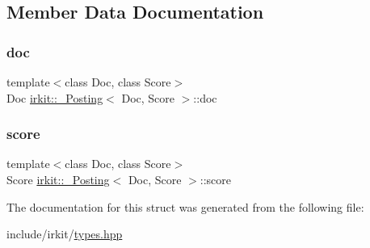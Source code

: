 \subsection{Member Data Documentation}
\mbox{\label{structirkit_1_1__Posting_a6ee624b39c69f2b8701701ecc8fe6a0b}} 
\subsubsection{\texorpdfstring{doc}{doc}}
{\footnotesize\ttfamily template$<$class Doc, class Score$>$ \\
Doc \mbox{\hyperlink{structirkit_1_1__Posting}{irkit\+::\+\_\+\+Posting}}$<$ Doc, Score $>$\+::doc}

\mbox{\label{structirkit_1_1__Posting_a3c5cc3b179d8fb975d3356847e34955f}} 
\subsubsection{\texorpdfstring{score}{score}}
{\footnotesize\ttfamily template$<$class Doc, class Score$>$ \\
Score \mbox{\hyperlink{structirkit_1_1__Posting}{irkit\+::\+\_\+\+Posting}}$<$ Doc, Score $>$\+::score}



The documentation for this struct was generated from the following file\+:\begin{DoxyCompactItemize}
\item 
include/irkit/\mbox{\hyperlink{types_8hpp}{types.\+hpp}}\end{DoxyCompactItemize}
